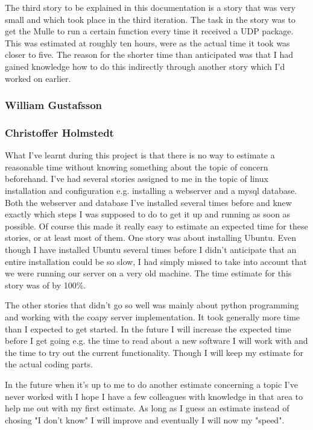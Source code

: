 The third story to be explained in this documentation is a story that was very small and which took place in the third iteration.
The task in the story was to get the Mulle to run a certain function every time it received a UDP package. This was estimated at roughly ten hours, 
were as the actual time it took was closer to five. The reason for the shorter time than anticipated was that I had gained knowledge how to do this 
indirectly through another story which I'd worked on earlier.

\subsubsection{William Gustafsson}
\subsubsection{Christoffer Holmstedt}
What I've learnt during this project is that there is no way to estimate a reasonable time without knowing something about the topic of concern beforehand.
I've had several stories assigned to me in the topic of linux installation and configuration e.g. installing a webserver and a mysql database.
Both the webserver and database I've installed several times before and knew exactly which steps I was supposed to do to get it up and running as soon as possible.
Of course this made it really easy to estimate an expected time for these stories, or at least most of them.
One story was about installing Ubuntu.
Even though I have installed Ubuntu several times before I didn't anticipate that an entire installation could be so slow, I had simply missed to take into account that we were running our server on a very old machine.
The time estimate for this story was of by 100\%.

The other stories that didn't go so well was mainly about python programming and working with the coapy server implementation. 
It took generally more time than I expected to get started.
In the future I will increase the expected time before I get going e.g. the time to read about a new software I will work with and the time to try out the current functionality.
Though I will keep my estimate for the actual coding parts.

In the future when it's up to me to do another estimate concerning a topic I've never worked with I hope I have a few colleagues with knowledge in that area to help me out with my first estimate.
As long as I guess an estimate instead of chosing "I don't know" I will improve and eventually I will now my "speed".

